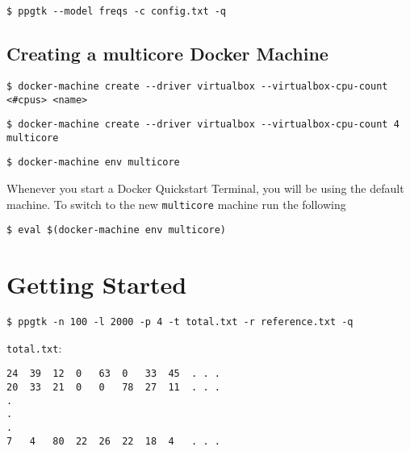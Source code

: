 \documentclass[11pt,english,letterpaper,oneside]{article}
\newcommand{\code}[1]{\hspace{5pt} \texttt{\$ #1}}
\begin{document}
\code{ppgtk -{}-model freqs -c config.txt -q}

\subsection{Creating a multicore Docker Machine}

\code{docker-machine create -{}-driver virtualbox -{}-virtualbox-cpu-count <\#cpus> <name>}

\code{docker-machine create -{}-driver virtualbox -{}-virtualbox-cpu-count 4 multicore}

\code{docker-machine env multicore}

Whenever you start a Docker Quickstart Terminal, you will be using the default machine. To switch to the new \texttt{multicore} machine run the following

\code{eval \$(docker-machine env multicore)}

\section{Getting Started}

\code{ppgtk -n 100 -l 2000 -p 4 -t total.txt -r reference.txt -q}

\texttt{total.txt}:

\begin{verbatim}
24	39	12	0	63	0	33	45	. . .
20	33	21	0	0	78	27	11	. . .
.
.
.
7	4	80	22	26	22	18	4	. . .
\end{verbatim}

\newpage

%
%
\end{document}
